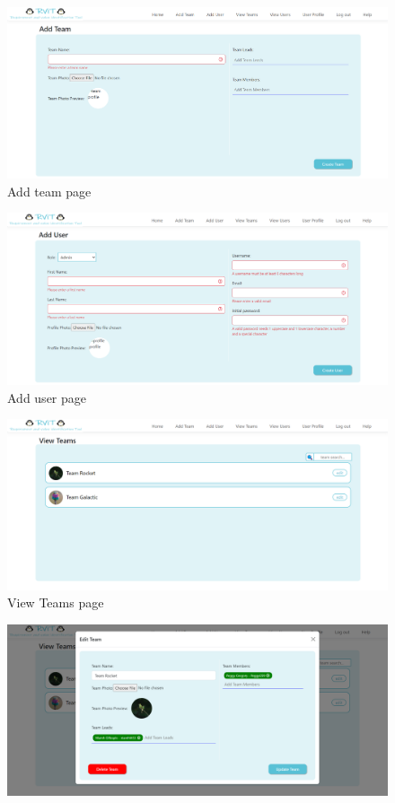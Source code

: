 \documentclass{l4proj}
\begin{document}
\begin{appendices}
\begin{figure}[h!]
\centering
\includegraphics[scale=0.4]{dissertation/images/addteam.png}
\caption{Add team page}
\label{fig: add team page}
\end{figure}
\hfill
\begin{figure}[h!]
\centering
\includegraphics[scale=0.4]{dissertation/images/adduser.png}
\caption{Add user page}
\label{fig: add user page}
\end{figure}
\hfill
\begin{figure}[h!]
\centering
\includegraphics[scale=0.4]{dissertation/images/viewteams.png}
\caption{View Teams page}
\label{fig: view team page}
\end{figure}
\hfill
\begin{figure}[h!]
\centering
\includegraphics[scale=0.4]{dissertation/images/editteam.png}

\end{figure}
\end{appendices}
\end{document}
